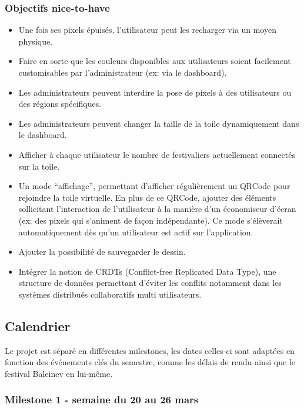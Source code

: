 \subsubsection{Objectifs \guillemotleft nice-to-have\guillemotright}

\begin{itemize}
  \item Une fois ses pixels épuisés, l'utilisateur peut les recharger via un moyen physique.
  \item Faire en sorte que les couleurs disponibles aux utilisateurs soient facilement customisables par l'administrateur (ex: via le dashboard).
  \item Les administrateurs peuvent interdire la pose de pixels à des utilisateurs ou des régions spécifiques.
  \item Les administrateurs peuvent changer la taille de la toile dynamiquement dans le dashboard.
  \item Afficher à chaque utilisateur le nombre de festivaliers actuellement connectés sur la toile.
  \item Un mode “affichage”, permettant d'afficher régulièrement un QRCode pour rejoindre la toile virtuelle. En plus de ce QRCode, ajouter des éléments sollicitant l'interaction de l'utilisateur à la manière d'un économiseur d'écran (ex: des pixels qui s'animent de façon indépendante). Ce mode s'élèverait automatiquement dès qu'un utilisateur est actif sur l'application.
  \item Ajouter la possibilité de sauvegarder le dessin.
  \item Intégrer la notion de CRDTs (Conflict-free Replicated Data Type), une structure de données permettant d'éviter les conflits notamment dans les systèmes distribués collaboratifs multi utilisateurs.
\end{itemize}

\subsection{Calendrier}

Le projet est séparé en différentes milestones, les dates celles-ci sont adaptées en fonction des événements clés du semestre, comme les délais de rendu ainsi que le festival Baleinev en lui-même.

\subsubsection{Milestone 1 - semaine du 20 au 26 mars}

